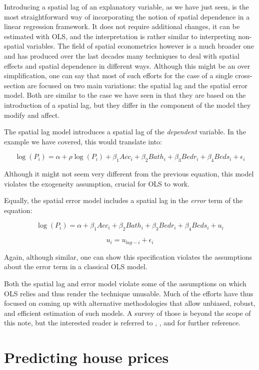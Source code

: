 \documentclass[
]{book}
\begin{document}
Introducing a spatial lag of an explanatory variable, as we have just seen, is the most straightforward way of incorporating the notion of spatial dependence in a linear regression framework. It does not require additional changes, it can be estimated with OLS, and the interpretation is rather similar to interpreting non-spatial variables. The field of spatial econometrics however is a much broader one and has produced over the last decades many techniques to deal with spatial effects and spatial dependence in different ways. Although this might be an over simplification, one can say that most of such efforts for the case of a single cross-section are focused on two main variations: the spatial lag and the spatial error model. Both are similar to the case we have seen in that they are based on the introduction of a spatial lag, but they differ in the component of the model they modify and affect.

The spatial lag model introduces a spatial lag of the \emph{dependent} variable. In the example we have covered, this would translate into:

\[
\log(P_i) = \alpha + \rho \log(P_i) + \beta_1 Acc_i + \beta_2 Bath_i + \beta_3 Bedr_i + \beta_4 Beds_i + \epsilon_i
\]

Although it might not seem very different from the previous equation, this model violates the exogeneity assumption, crucial for OLS to work.

Equally, the spatial error model includes a spatial lag in the \emph{error} term of the equation:

\[
\log(P_i) = \alpha + \beta_1 Acc_i + \beta_2 Bath_i + \beta_3 Bedr_i + \beta_4 Beds_i + u_i
\]

\[
u_i = u_{lag-i} + \epsilon_i
\]

Again, although similar, one can show this specification violates the assumptions about the error term in a classical OLS model.

Both the spatial lag and error model violate some of the assumptions on which OLS relies and thus render the technique unusable. Much of the efforts have thus focused on coming up with alternative methodologies that allow unbiased, robust, and efficient estimation of such models. A survey of those is beyond the scope of this note, but the interested reader is referred to \citet{anselin1988spatial}, \citet{anselin2003spatial}, and \citet{anselin2014modern} for further reference.

\hypertarget{predicting-house-prices}{%
\section{Predicting house prices}\label{predicting-house-prices}}
\end{document}
